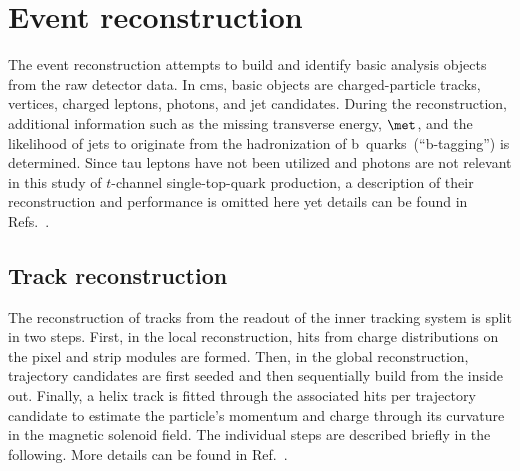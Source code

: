 \chapter{Event reconstruction}
\label{ch:reconstruction}


The event reconstruction attempts to build and identify basic analysis objects from the raw detector data. In \gls{cms}, basic objects are charged-particle tracks, vertices, charged leptons, photons, and jet candidates. During the reconstruction, additional information such as the missing transverse energy, $\met$, and the likelihood of jets to originate from the hadronization of b~quarks~(``b-tagging'') is determined. Since tau leptons have not been utilized and photons are not relevant in this study of $t$-channel single-top-quark production, a description of their reconstruction and performance is omitted here yet details can be found in Refs.~\cite{Khachatryan:2015dfa,Khachatryan:2015iwa}.


\section{Track reconstruction}

The reconstruction of tracks from the readout of the inner tracking system is split in two steps. First, in the local reconstruction, hits from charge distributions on the pixel and strip modules are formed. Then, in the global reconstruction, trajectory candidates are first seeded and then sequentially build from the inside out. Finally, a helix track is fitted through the associated hits per trajectory candidate to estimate the particle's momentum and charge through its curvature in the magnetic solenoid field. The individual steps are described briefly in the following. More details can be found in Ref.~\cite{Chatrchyan:2014fea}.

